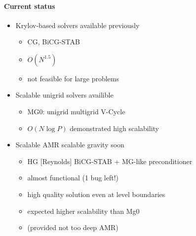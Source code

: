 \NEWSEC


\subsection{\ssRecentGravity}



%  
%
\begin{frame}[fragile,label=ss-recent-gravity] 
\secframetitle{\ssRecentGravity}
\framesubtitle{Current status}
\begin{itemize}
   \item Krylov-based solvers available previously
\begin{itemize}
   \item        CG, BiCG-STAB
 \item       $O(N^{1.5})$
\item       not feasible for large problems
\end{itemize}
   \item Scalable unigrid solvers availible
\begin{itemize}
   \item        MG0: unigrid multigrid V-Cycle
\item         $O(N \log P)$
         demonstrated high scalability
\end{itemize}
   \item  Scalable AMR scalable gravity soon
\begin{itemize}
\item HG [Reynolds] BiCG-STAB + MG-like preconditioner
\item         almost functional (1 bug left!)
\item          high quality solution even at level boundaries
\item         expected higher scalability than Mg0
\item          (provided not too deep AMR)
\end{itemize}
\end{itemize}
\end{frame}
%
%
